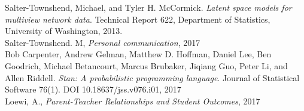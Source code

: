 \documentclass[11pt]{scrartcl}
\begin{document}
Salter-Townshend, Michael, and Tyler H. McCormick. \textit{Latent space models for multiview network data}. Technical Report 622, Department of Statistics, University of Washington, 2013.\\

Salter-Townshend. M, \textit{Personal communication}, 2017\\

Bob Carpenter, Andrew Gelman, Matthew D. Hoffman, Daniel Lee, Ben Goodrich, Michael Betancourt, Marcus Brubaker, Jiqiang Guo, Peter Li, and Allen Riddell. \textit{Stan: A probabilistic programming language}. Journal of Statistical Software 76(1). DOI 10.18637/jss.v076.i01, 2017\\

Loewi, A., \textit{Parent-Teacher Relationships and Student Outcomes}, 2017




\end{document}
